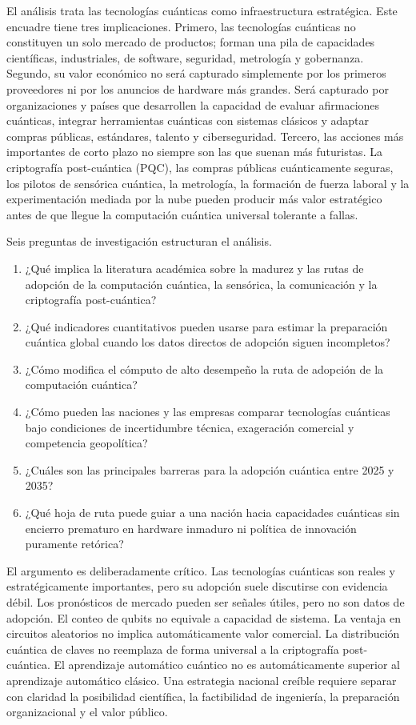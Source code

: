 \documentclass[
  11pt,
  letterpaper,
]{article}
\providecommand{\tightlist}{%
  \setlength{\itemsep}{0pt}\setlength{\parskip}{0pt}}
\begin{document}
El análisis trata las tecnologías cuánticas como infraestructura
estratégica. Este encuadre tiene tres implicaciones. Primero, las
tecnologías cuánticas no constituyen un solo mercado de productos;
forman una pila de capacidades científicas, industriales, de software,
seguridad, metrología y gobernanza. Segundo, su valor económico no será
capturado simplemente por los primeros proveedores ni por los anuncios
de hardware más grandes. Será capturado por organizaciones y países que
desarrollen la capacidad de evaluar afirmaciones cuánticas, integrar
herramientas cuánticas con sistemas clásicos y adaptar compras públicas,
estándares, talento y ciberseguridad. Tercero, las acciones más
importantes de corto plazo no siempre son las que suenan más futuristas.
La criptografía post-cuántica (PQC), las compras públicas cuánticamente
seguras, los pilotos de sensórica cuántica, la metrología, la formación
de fuerza laboral y la experimentación mediada por la nube pueden
producir más valor estratégico antes de que llegue la computación
cuántica universal tolerante a fallas.

Seis preguntas de investigación estructuran el análisis.

\begin{enumerate}
\def\labelenumi{\arabic{enumi}.}
\tightlist
\item
  ¿Qué implica la literatura académica sobre la madurez y las rutas de
  adopción de la computación cuántica, la sensórica, la comunicación y
  la criptografía post-cuántica?
\item
  ¿Qué indicadores cuantitativos pueden usarse para estimar la
  preparación cuántica global cuando los datos directos de adopción
  siguen incompletos?
\item
  ¿Cómo modifica el cómputo de alto desempeño la ruta de adopción de la
  computación cuántica?
\item
  ¿Cómo pueden las naciones y las empresas comparar tecnologías
  cuánticas bajo condiciones de incertidumbre técnica, exageración
  comercial y competencia geopolítica?
\item
  ¿Cuáles son las principales barreras para la adopción cuántica entre
  2025 y 2035?
\item
  ¿Qué hoja de ruta puede guiar a una nación hacia capacidades cuánticas
  sin encierro prematuro en hardware inmaduro ni política de innovación
  puramente retórica?
\end{enumerate}

El argumento es deliberadamente crítico. Las tecnologías cuánticas son
reales y estratégicamente importantes, pero su adopción suele discutirse
con evidencia débil. Los pronósticos de mercado pueden ser señales
útiles, pero no son datos de adopción. El conteo de qubits no equivale a
capacidad de sistema. La ventaja en circuitos aleatorios no implica
automáticamente valor comercial. La distribución cuántica de claves no
reemplaza de forma universal a la criptografía post-cuántica. El
aprendizaje automático cuántico no es automáticamente superior al
aprendizaje automático clásico. Una estrategia nacional creíble requiere
separar con claridad la posibilidad científica, la factibilidad de
ingeniería, la preparación organizacional y el valor público.
\end{document}

